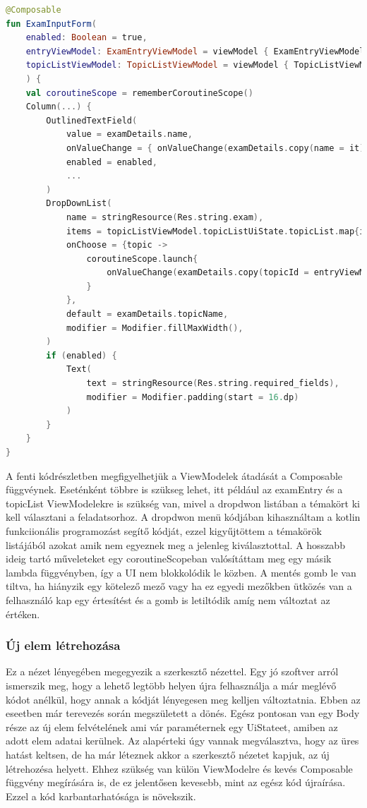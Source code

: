 \begin{lstlisting}[caption={Szerkesztő nézet kódja.}, label={lst:EditScreen}, language=Kotlin]
@Composable
fun ExamInputForm(
    enabled: Boolean = true,
    entryViewModel: ExamEntryViewModel = viewModel { ExamEntryViewModel() },    
    topicListViewModel: TopicListViewModel = viewModel { TopicListViewModel() },
    ) {
    val coroutineScope = rememberCoroutineScope()
    Column(...) {
        OutlinedTextField(
            value = examDetails.name,
            onValueChange = { onValueChange(examDetails.copy(name = it)) },
            enabled = enabled,
            ...
        )
        DropDownList(
            name = stringResource(Res.string.exam),
            items = topicListViewModel.topicListUiState.topicList.map{it.topic}.filterNot{ it == examDetails.topicName },
            onChoose = {topic ->
                coroutineScope.launch{
                    onValueChange(examDetails.copy(topicId = entryViewModel.getTopicIdByTopic(topic)))
                }
            },
            default = examDetails.topicName,
            modifier = Modifier.fillMaxWidth(),
        )
        if (enabled) {
            Text(
                text = stringResource(Res.string.required_fields),
                modifier = Modifier.padding(start = 16.dp)
            )
        }
    }
}
\end{lstlisting}

A fenti kódrészletben megfigyelhetjük a ViewModelek átadását a Composable függvéynek.
Eseténként többre is szükseg lehet, itt például az examEntry és a topicList ViewModelekre is szükség van, mivel a dropdwon listában a témakört ki kell választani a feladatsorhoz.
A dropdwon menü kódjában kihasználtam a kotlin funkciionális programozást segítő kódját, ezzel kigyűjtöttem a témakörök listájából azokat amik nem egyeznek meg a jelenleg kiválasztottal.
A hosszabb ideig tartó műveleteket egy coroutineScopeban valósítáttam meg egy másik lambda függvényben, így a UI nem blokkolódik le közben.
A mentés gomb le van tiltva, ha hiányzik egy kötelező mező vagy ha ez egyedi mezőkben ütközés van a felhasználó kap egy értesítést és a gomb is letiltódik amíg nem változtat az értéken.

\pagebreak

\subsubsection{Új elem létrehozása}

Ez a nézet lényegében megegyezik a szerkesztő nézettel.
Egy jó szoftver arról ismerszik meg, hogy a lehető legtöbb helyen újra felhasználja a már meglévő kódot anélkül, hogy annak a kódját lényegesen meg kelljen változtatnia.
Ebben az eseetben már terevezés során megszületett a dönés. Egész pontosan van egy Body része az új elem felvételének ami vár paraméternek egy UiStateet, amiben az adott elem adatai kerülnek.
Az alapérteki úgy vannak megválasztva, hogy az üres hatást keltsen, de ha már léteznek akkor a szerkesztő nézetet kapjuk, az új létrehozésa helyett.
Ehhez szükség van külön ViewModelre és kevés Composable függvény megírására is, de ez jelentősen kevesebb, mint az egész kód újraírása. Ezzel a kód karbantarhatósága is növekszik.  

